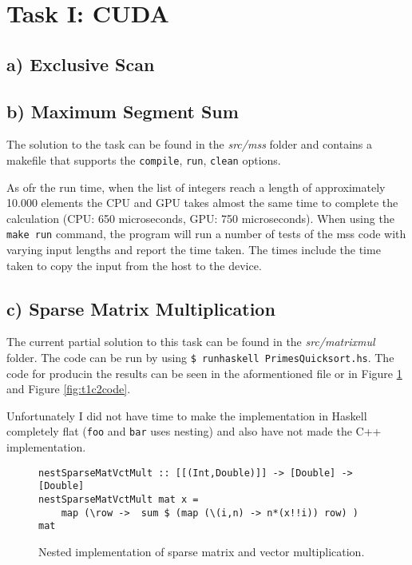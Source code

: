 \section{Task I: CUDA}

\subsection{a) Exclusive Scan}

\subsection{b) Maximum Segment Sum}

The solution to the task can be found in the \textit{src/mss} folder and
contains a makefile that supports the \texttt{compile}, \texttt{run},
\texttt{clean} options.

As ofr the run time, when the list of integers reach a length of approximately
10.000 elements the CPU and GPU takes almost the same time to complete the
calculation (CPU: 650 microseconds, GPU: 750 microseconds). When using the
\texttt{make run} command, the program will run a number of tests of the mss
code with varying input lengths and report the time taken. The times include the
time taken to copy the input from the host to the device.

\subsection{c) Sparse Matrix Multiplication}

The current partial solution to this task can be found in the
\textit{src/matrixmul} folder. The code can be run by using
\texttt{\$ runhaskell PrimesQuicksort.hs}. The code for producin the results
can be seen in the aformentioned file or in Figure \ref{fig:t1c1code} and Figure
\ref{fig:t1c2code}.

Unfortunately I did not have time to make the implementation in Haskell
completely flat (\texttt{foo} and \texttt{bar} uses nesting) and also have not
made the C++ implementation.

\begin{figure}
    \begin{lstlisting}
nestSparseMatVctMult :: [[(Int,Double)]] -> [Double] -> [Double]
nestSparseMatVctMult mat x =
    map (\row ->  sum $ (map (\(i,n) -> n*(x!!i)) row) ) mat
    \end{lstlisting}
    \caption{Nested implementation of sparse matrix and vector multiplication.}
    \label{fig:t1c1code}
\end{figure}

